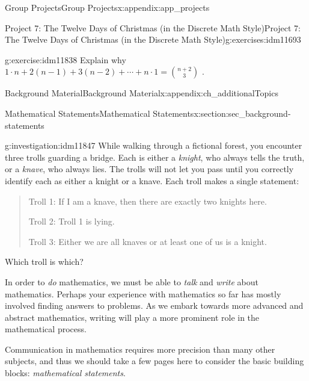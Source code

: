 \documentclass[oneside,10pt,]{book}
\numberwithin{equation}{chapter}
\begin{document}
\begin{appendixptx}{Group Projects}{}{Group Projects}{}{}{x:appendix:app_projects}
\begin{exercises-section-numberless}{Project 7: The Twelve Days of Christmas (in the Discrete Math Style)}{}{Project 7: The Twelve Days of Christmas (in the Discrete Math Style)}{}{}{g:exercises:idm11693}
\begin{divisionexercise}{6}{}{}{g:exercise:idm11838}%
Explain why \(1 \cdot n + 2\left( n - 1 \right) + 3\left( n - 2 \right) + \cdots + n \cdot 1 =
\binom{n + 2}{3}\) .%
\end{divisionexercise}%
\end{exercises-section-numberless}
\end{appendixptx}
%
%
\typeout{************************************************}
\typeout{************************************************}
%
\begin{appendixptx}{Background Material}{}{Background Material}{}{}{x:appendix:ch_additionalTopics}
%
%
\typeout{************************************************}
\typeout{************************************************}
%
\begin{sectionptx}{Mathematical Statements}{}{Mathematical Statements}{}{}{x:section:sec_background-statements}
\begin{introduction}{}%
\begin{investigation}{}{g:investigation:idm11847}%
While walking through a fictional forest, you encounter three trolls guarding a bridge. Each is either a \emph{knight}, who always tells the truth, or a \emph{knave}, who always lies. The trolls will not let you pass until you correctly identify each as either a knight or a knave. Each troll makes a single statement:%
\begin{quote}%
Troll 1: If I am a knave, then there are exactly two knights here.%
\par
Troll 2: Troll 1 is lying.%
\par
Troll 3: Either we are all knaves or at least one of us is a knight.%
\end{quote}
Which troll is which?  %
\end{investigation}
In order to \emph{do} mathematics, we must be able to \emph{talk} and \emph{write} about mathematics. Perhaps your experience with mathematics so far has mostly involved finding answers to problems. As we embark towards more advanced and abstract mathematics, writing will play a more prominent role in the mathematical process.%
\par
Communication in mathematics requires more precision than many other subjects, and thus we should take a few pages here to consider the basic building blocks: \emph{mathematical statements}.%

\end{introduction}
\end{sectionptx}
\end{appendixptx}
\end{document}
